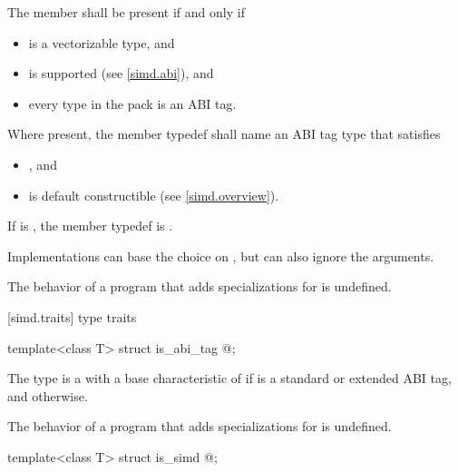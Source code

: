 \begin{itemdescr}
\pnum
The member  shall be present if and only if
\begin{itemize}
  \item {} is a vectorizable type, and
  \item {} is supported (see \ref{simd.abi}), and
  \item every type in the  pack is an ABI tag.
\end{itemize}

\pnum
Where present, the member typedef  shall name an ABI tag type that satisfies
\begin{itemize}
  \item {}, and
  \item {} is default constructible (see \ref{simd.overview}).
\end{itemize}
If  is , the member typedef  is .
\begin{note}
  Implementations can base the choice on , but can also ignore the  arguments.
\end{note}

\pnum
The behavior of a program that adds specializations for  is undefined.
\end{itemdescr}

[simd.traits]{ type traits}

\begin{itemdecl}
template<class T> struct is_abi_tag { @\seebelow@ };
\end{itemdecl}

\begin{itemdescr}
\pnum
The type  is a  with a base characteristic of  if  is a standard or extended ABI tag, and  otherwise.

\pnum
The behavior of a program that adds specializations for  is undefined.
\end{itemdescr}

\begin{itemdecl}
template<class T> struct is_simd { @\seebelow@ };
\end{itemdecl}

